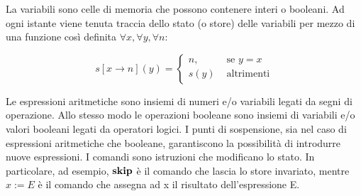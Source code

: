 La variabili sono celle di memoria che possono contenere interi o booleani. Ad ogni istante
viene tenuta traccia dello stato (o store) delle variabili per mezzo di una
funzione così definita
$ \forall x, \forall y, \forall n$:

$$ s[x \rightarrow n](y) =
	\begin{cases} n, & \mbox{ se } y=x \\
				  s(y) & \mbox{ altrimenti}
	\end{cases}
$$

Le espressioni aritmetiche sono insiemi di numeri e/o variabili legati da segni di operazione.
Allo stesso modo le operazioni booleane sono insiemi di variabili e/o valori booleani legati da
operatori logici.
I punti di sospensione, sia nel caso di espressioni aritmetiche che booleane,
garantiscono la possibilità di introdurre nuove espressioni.
I comandi sono istruzioni che modificano lo stato. In particolare, ad esempio,
$\mathop{\textup{\textbf{skip}}}$ è il comando che lascia lo store invariato, mentre $x:=E$ è il comando che 
assegna ad x il risultato dell'espressione E.